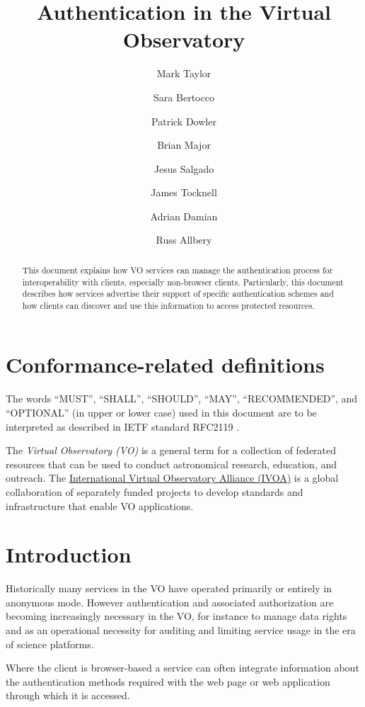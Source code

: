 \documentclass[11pt,a4paper]{ivoa}
\title{Authentication in the Virtual Observatory}
\author{Mark Taylor}
\author{Sara Bertocco}
\author{Patrick Dowler}
\author{Brian Major}
\author{Jesus Salgado}
\author{James Tocknell}
\author{Adrian Damian}
\author{Russ Allbery}
\begin{document}
\begin{abstract}
This document explains how
VO services can manage the authentication process for
interoperability with clients, especially non-browser clients.
Particularly, this document
describes how services advertise their
support of specific authentication schemes and how
clients can discover and use this information to access protected
resources.
\end{abstract}




\section*{Conformance-related definitions}

The words ``MUST'', ``SHALL'', ``SHOULD'', ``MAY'', ``RECOMMENDED'', and
``OPTIONAL'' (in upper or lower case) used in this document are to be
interpreted as described in IETF standard RFC2119 \citep{std:RFC2119}.

The \emph{Virtual Observatory (VO)} is a
general term for a collection of federated resources that can be used
to conduct astronomical research, education, and outreach.
The \href{https://www.ivoa.net}{International
Virtual Observatory Alliance (IVOA)} is a global
collaboration of separately funded projects to develop standards and
infrastructure that enable VO applications.


\section{Introduction}\label{sec:intro}

Historically many services in the VO have operated primarily or
entirely in anonymous mode.
However authentication and associated authorization
are becoming increasingly necessary in the VO,
for instance to manage data rights and as an operational necessity for
auditing and limiting service usage in the era of science platforms.

Where the client is browser-based
a service can often integrate information about the authentication
methods required with the web page or web application through which
it is accessed.
\end{document}
